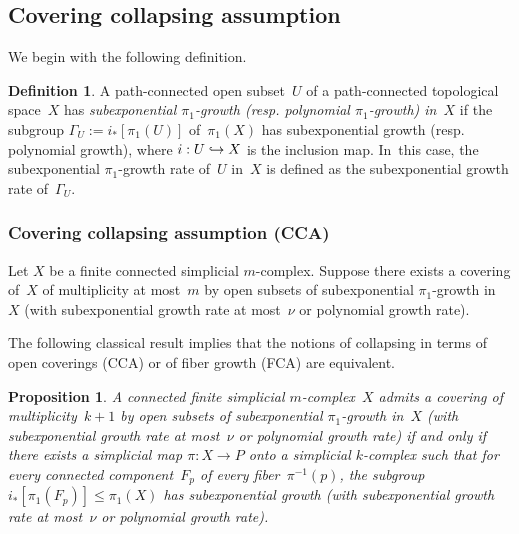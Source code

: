 \documentclass[11pt]{article}
\newcommand{\resp}{resp.\xspace}
\newcommand\hto{\mathrel{\lhook\joinrel\to}}
\newtheorem{proposition}[theorem]{Proposition}
\theoremstyle{definition}
\newtheorem{definition}[theorem]{Definition}
\numberwithin{equation}{section}
\begin{document}
\subsection{Covering collapsing assumption} \label{sec:zerovol}
We begin with the following definition.

\begin{definition} \label{def:subexp}
A path-connected open subset~$U$ of a path-connected topological space~$X$ has \emph{subexponential $\pi_1$-growth (\resp polynomial $\pi_1$-growth) in~$X$} if the subgroup $\Gamma_U:=i_*[\pi_1(U)]$ of~$\pi_1(X)$ has subexponential growth (\resp polynomial growth), where $i:U \hto X$ is the inclusion map. In~this case, the subexponential $\pi_1$-growth rate of~$U$ in~$X$ is defined as the subexponential growth rate of~$\Gamma_U$.
\end{definition}

\subsubsection*{Covering collapsing assumption (CCA)}
Let $X$ be a finite connected simplicial $m$\nobreakdash-complex.
Suppose there exists a covering of~$X$ of multiplicity at most~$m$ by open subsets of subexponential $\pi_1$-growth in~$X$ (with subexponential growth rate at most~$\nu$ or polynomial growth rate).

The following classical result implies that the notions of collapsing in terms of open coverings (CCA) or of fiber growth (FCA) are equivalent.

\begin{proposition} \label{prop:cover}
A connected finite simplicial $m$\nobreakdash-complex~$X$ admits a covering of multiplicity~$k+1$ by open subsets of subexponential $\pi_1$-growth in~$X$ (with subexponential growth rate at most~$\nu$ or polynomial growth rate) if and only if there exists a simplicial map $\pi:X \to P$ onto a simplicial $k$-complex such that for every connected component~$F_p$ of every fiber~$\pi^{-1}(p)$, the subgroup $i_*[\pi_1(F_p)] \leqslant \pi_1(X)$ has subexponential growth (with subexponential growth rate at most~$\nu$ or polynomial growth rate).
\end{proposition}
\end{document}

